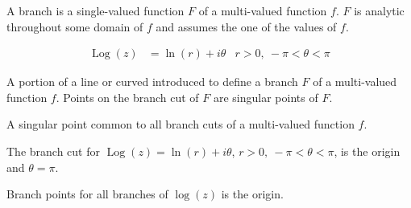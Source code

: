 \documentclass[12pt, english]{book}
\DeclareMathOperator\Log{Log}
\begin{document}
	\begin{definition}[Branch]
		\label{Branch Definition - Complex}
		A branch is a single-valued function \(F\) of a multi-valued function \(f\). \(F\) is analytic throughout some domain of \(f\) and assumes the one of the values of \(f\).
	\end{definition}
	
	\begin{definition}
		\label{Principal Branch Definition - Complex}
		\begin{align*}
			\Log(z) &= \ln(r) + i\theta & r>0, \ -\pi < \theta < \pi
		\end{align*}
	\end{definition}

	\begin{definition}
		\label{Branch Cut Definition - Complex}
		A portion of a line or curved introduced to define a branch \(F\) of a multi-valued function \(f\). Points on the branch cut of \(F\) are singular points of \(F\).
	\end{definition}

	\begin{definition}
		\label{Branch Point Definition - Complex}
		A singular point common to all branch cuts of a multi-valued function \(f\).
	\end{definition}

	\begin{example}
		The branch cut for \(\Log(z) = \ln(r) + i\theta\), \(r>0,\ -\pi<\theta<\pi\), is the origin and \(\theta = \pi\).
		
		Branch points for all branches of \(\log(z)\) is the origin.
	\end{example}
	
\end{document}
